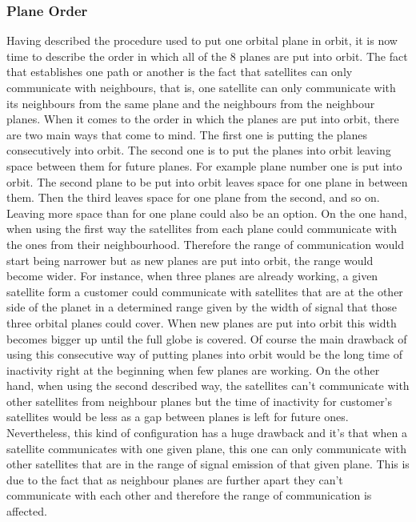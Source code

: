 \subsubsection{Plane Order}
Having described the procedure used to put one orbital plane in orbit, it is now time to describe the order in which all of the 8 planes are put into orbit. The fact that establishes one path or another is the fact that satellites can only communicate with neighbours, that is, one satellite can only communicate with its neighbours from the same plane and the neighbours from the neighbour planes.
\newline\newline
When it comes to the order in which the planes are put into orbit, there are two main ways that come to mind. The first one is putting the planes consecutively into orbit. The second one is to put the planes into orbit leaving space between them for future planes. For example plane number one is put into orbit. The second plane to be put into orbit leaves space for one plane in between them. Then the third leaves space for one plane from the second, and so on. Leaving more space than for one plane could also be an option.
\newline\newline
On the one hand, when using the first way the satellites from each plane could communicate with the ones from their neighbourhood. Therefore the range of communication would start being narrower but as new planes are put into orbit, the range would become wider. For instance, when three planes are already working, a given satellite form a customer could communicate with satellites that are at the other side of the planet in a determined range given by the width of signal that those three orbital planes could cover. When new planes are put into orbit this width becomes bigger up until the full globe is covered. Of course the main drawback of using this consecutive way of putting planes into orbit would be the long time of inactivity right at the beginning when few planes are working.
\newline\newline
On the other hand, when using the second described way, the satellites can't communicate with other satellites from neighbour planes but the time of inactivity for customer's satellites would be less as a gap between planes is left for future ones. Nevertheless, this kind of configuration has a huge drawback and it's that when a satellite communicates with one given plane, this one can only communicate with other satellites that are in the range of signal emission of that given plane. This is due to the fact that as neighbour planes are further apart they can't communicate with each other and therefore the range of communication is affected.
